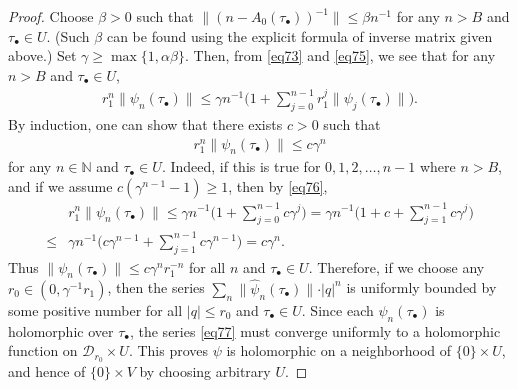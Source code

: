 \documentclass[12pt,a4paper,notitlepage]{article}
\theoremstyle{definition}
\theoremstyle{plain}
\newcommand{\mc}{\mathcal}
\newcommand{\wht}{\widehat}
\newcommand{\mbb}{\mathbb}
\newcommand{\blt}{\bullet}
\numberwithin{equation}{section}
\begin{document}
\begin{proof}
	
Choose $\beta>0$ such that  $\lVert (n- A_0(\tau_\blt))^{-1} \lVert\leq \beta n^{-1}$ for any $n> B$ and $\tau_\blt\in U$. (Such $\beta$ can be found using the explicit formula of inverse matrix given above.) Set $\gamma\geq\max\{1,\alpha\beta\}$. Then, from \eqref{eq73} and \eqref{eq75}, we see that for any $n>B$ and $\tau_\blt\in U$,
	\begin{align}
	r_1^n\lVert \psi_n(\tau_\blt) \lVert\leq \gamma n^{-1}\Big(1+\sum_{j=0}^{n-1}r_1^j\lVert \psi_j(\tau_\blt) \lVert\Big).\label{eq76}
	\end{align}
	By induction, one can show that there exists $c>0$ such that
	\begin{align*}
	r_1^n\lVert\psi_n(\tau_\blt)\lVert\leq c\gamma^n 
	\end{align*}
	for any $n\in\mbb N$ and $\tau_\blt\in U$. Indeed, if this is true for $0,1,2,\dots,n-1$ where $n>B$, and if we assume $c(\gamma^{n-1}-1)\geq 1$, then by \eqref{eq76},
	\begin{align*}
	&r_1^n\lVert \psi_n(\tau_\blt) \lVert\leq \gamma n^{-1}\Big(1+\sum_{j=0}^{n-1}c\gamma^j\Big)=\gamma n^{-1}\Big(1+c+\sum_{j=1}^{n-1}c\gamma^j\Big)\nonumber\\
	\leq &\gamma n^{-1}\Big(c\gamma^{n-1}+\sum_{j=1}^{n-1}c\gamma^{n-1}\Big)=c\gamma^n.
	\end{align*}
	Thus $\lVert\psi_n(\tau_\blt)\lVert\leq c\gamma^nr_1^{-n}$ for all $n$ and $\tau_\blt\in U$. Therefore, if we choose any $r_0\in(0,\gamma^{-1}r_1)$, then   the series $\sum_n\lVert \wht \psi_n(\tau_\blt) \lVert \cdot|q|^n$ is uniformly bounded by some positive number for all  $|q|\leq r_0$ and $\tau_\blt\in U$. Since each $\psi_n(\tau_\blt)$ is holomorphic over $\tau_\blt$, the series \eqref{eq77} must converge uniformly to a holomorphic function on $\mc D_{r_0}\times U$. This proves $\psi$ is holomorphic on a neighborhood of $\{0\}\times U$, and hence of $\{0\}\times V$ by choosing arbitrary $U$.
\end{proof}
\end{document}
